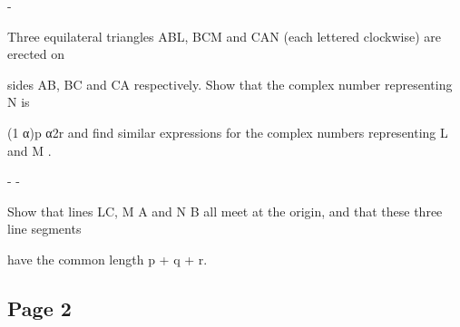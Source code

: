 \documentclass[12pt]{article}
\begin{document}
\begin{flushleft}
-\par
Three equilateral triangles ABL, BCM and CAN (each lettered clockwise) are erected on\par
sides AB, BC and CA respectively. Show that the complex number representing N is\par
(1 α)p α2r and find similar expressions for the complex numbers representing L and M .\par
- -\par
Show that lines LC, M A and N B all meet at the origin, and that these three line segments\par
have the common length p + q + r.\par
\end{flushleft}
\subsection*{Page 2}
\end{document}
